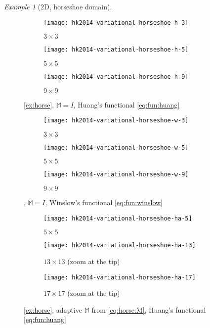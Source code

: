 \documentclass[american]{scrartcl}
\providecommand{\M}{\mathbb{M}}
\theoremstyle{remark}
\newtheorem{example}{\hspace{1ex}Example}[section]
\begin{document}
\begin{example}[2D, horseshoe domain]
\begin{figure}[p]
   \begin{subfigure}[t]{0.31\linewidth}
      \texttt{[image: hk2014-variational-horseshoe-h-3]}      \caption{$3 \times 3$}
   \end{subfigure}   \hfill   \begin{subfigure}[t]{0.31\linewidth}
      \texttt{[image: hk2014-variational-horseshoe-h-5]}      \caption{$5 \times 5$}
   \end{subfigure}   \hfill   \begin{subfigure}[t]{0.31\linewidth}
      \texttt{[image: hk2014-variational-horseshoe-h-9]}      \caption{$9 \times 9$}
   \end{subfigure}
   \caption{      \cref{ex:horse},
      $\M = I$,
      Huang's functional \cref{eq:fun:huang}
   }\label{fig:horse:I:huang}
\end{figure}

\begin{figure}[p]
   \begin{subfigure}[t]{0.31\linewidth}
      \texttt{[image: hk2014-variational-horseshoe-w-3]}      \caption{$3 \times 3$}
   \end{subfigure}   \hfill   \begin{subfigure}[t]{0.31\linewidth}
      \texttt{[image: hk2014-variational-horseshoe-w-5]}      \caption{$5 \times 5$}
   \end{subfigure}   \hfill   \begin{subfigure}[t]{0.31\linewidth}
      \texttt{[image: hk2014-variational-horseshoe-w-9]}      \caption{$9 \times 9$}
   \end{subfigure}
   \caption{      ,
      $\M = I$,
      Winslow's functional \cref{eq:fun:winslow}
   }\label{fig:horse:I:winslow}
\end{figure}

\begin{figure}[p]
   \begin{subfigure}[t]{0.31\linewidth}
      \texttt{[image: hk2014-variational-horseshoe-ha-5]}      \caption{$5 \times 5$}
   \end{subfigure}   \hfill   \begin{subfigure}[t]{0.31\linewidth}
      \texttt{[image: hk2014-variational-horseshoe-ha-13]}      \caption{$13 \times 13$ (zoom at the tip)}
   \end{subfigure}   \hfill   \begin{subfigure}[t]{0.31\linewidth}
      \texttt{[image: hk2014-variational-horseshoe-ha-17]}      \caption{$17 \times 17$ (zoom at the tip)}
   \end{subfigure}
   \caption{      \cref{ex:horse},
      adaptive $\M$ from \cref{eq:horse:M},
      Huang's functional \cref{eq:fun:huang}
   }\label{fig:horse:A:huang}
\end{figure}


\end{example}
\end{document}
